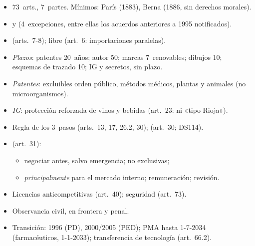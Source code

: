 \documentclass{article}
\begin{document}
\begin{columnas}
\begin{itemize}
\item 73~arts., 7~partes. Mínimos: París (1883), Berna (1886, sin derechos morales).
\item {} y  (4~excepciones, entre ellas los acuerdos anteriores a 1995 notificados).
\item {} (arts.~7-8);  libre (art.~6: importaciones paralelas).
\end{itemize}
\begin{itemize}
\item \emph{Plazos}: patentes 20~años; autor 50; marcas 7~renovables; dibujos 10; esquemas de trazado 10; IG y secretos, sin plazo.
\item \emph{Patentes}: excluibles orden público, métodos médicos, plantas y animales (no microorganismos).
\item \emph{IG}: protección reforzada de vinos y bebidas (art.~23: ni «tipo Rioja»).
\end{itemize}
\begin{itemize}
\item Regla de los 3~pasos (arts.~13, 17, 26.2, 30);  (art.~30; DS114).
\item {} (art.~31):
  \begin{itemize}
  \item negociar antes, salvo emergencia; no exclusivas;
  \item \emph{principalmente} para el mercado interno; remuneración; revisión.
  \end{itemize}
\item Licencias anticompetitivas (art.~40); seguridad (art.~73).
\end{itemize}
\begin{itemize}
\item Observancia civil, en frontera y penal.
\item Transición: 1996 (PD), 2000/2005 (PED); PMA hasta 1-7-2034 (farmacéuticos, 1-1-2033); transferencia de tecnología (art.~66.2).
\end{itemize}


\end{columnas}
\end{document}
